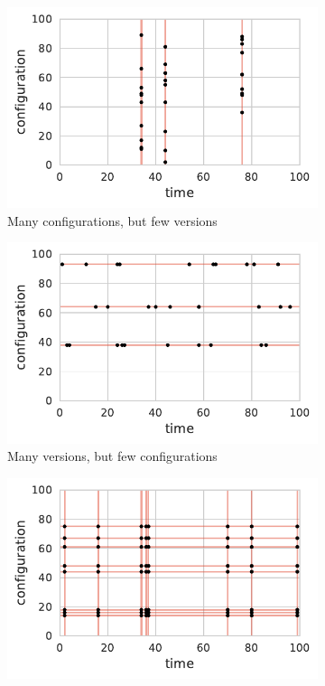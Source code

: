 \documentclass[sigconf]{acmart}
\begin{document}
	\begin{figure}
		\captionsetup{format=hang}
		\begin{subfigure}{0.49\linewidth}
			\includegraphics[width=\linewidth]{images/sampling_1.pdf}
			\caption{Many configurations, but few versions}
			\label{fig:sampling_configurations}
		\end{subfigure}
		\hfill
		\begin{subfigure}{0.49\linewidth}
			\includegraphics[width=\linewidth]{images/sampling_2.pdf}
			\caption{Many versions, but few configurations}
			\label{fig:sampling_versions}
			\end{subfigure}
		\vfill
		\begin{subfigure}{0.49\linewidth}
			\includegraphics[width=\linewidth]{images/sampling_3.pdf}

\end{subfigure}
\end{figure}
\end{document}
